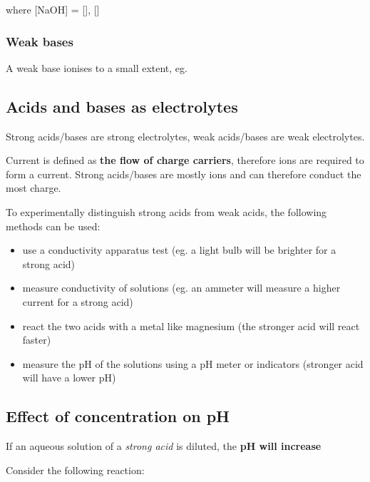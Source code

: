 			where [NaOH] = [], []

		\subsubsection{Weak bases}
		
			A weak base ionises to a small extent, eg. 

			\begin{center}
			\end{center}
	
	\subsection{Acids and bases as electrolytes}

		Strong acids/bases are strong electrolytes, weak acids/bases are weak electrolytes.

		Current is defined as \textbf{the flow of charge carriers}, therefore ions are required to form a current. Strong acids/bases are mostly ions and can therefore conduct the most charge.

		To experimentally distinguish strong acids from weak acids, the following methods can be used:

		\begin{itemize}
			\item use a conductivity apparatus test (eg. a light bulb will be brighter for a strong acid)
			\item measure conductivity of solutions (eg. an ammeter will measure a higher current for a strong acid)
			\item react the two acids with a metal like magnesium (the stronger acid will react faster)
			\item measure the pH of the solutions using a pH meter or indicators (stronger acid will have a lower pH)
		\end{itemize}

	\subsection{Effect of concentration on pH}
		
		If an aqueous solution of a \textit{strong acid} is diluted, the \textbf{pH will increase}

		Consider the following reaction:

		\begin{center}
		\end{center}
		
